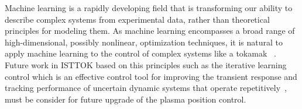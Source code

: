 Machine learning is a rapidly developing field that is transforming our ability to describe complex systems from experimental data, rather than theoretical principles for modeling them. As machine learning encompasses a broad range of high-dimensional, possibly nonlinear, optimization techniques, it is natural to apply machine learning to the control of complex systems like a tokamak ~\cite[Chapter~10]{DataDriven2019}. Future work in ISTTOK based on this principles such as the iterative learning control which is an effective control tool for improving the transient response and tracking performance of uncertain dynamic systems that operate repetitively~\cite{Ahn2007}, must be consider for future upgrade of the plasma position control.\smallskip

